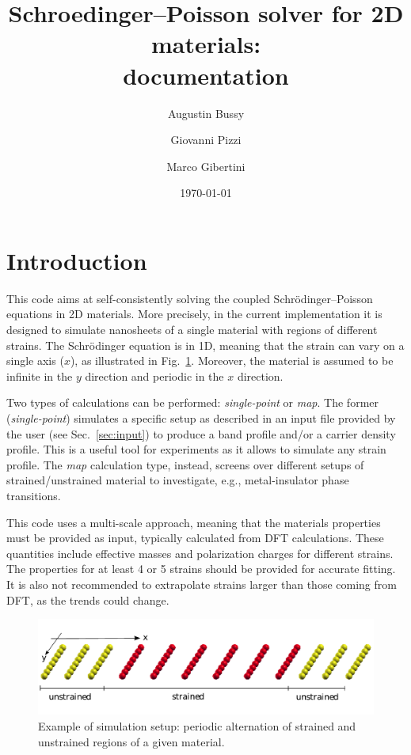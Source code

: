 \documentclass[a4paper,12pt]{article}
\begin{document}
\title{Schroedinger--Poisson solver for 2D materials:\\documentation}
\date{\today}
\author{Augustin Bussy \and Giovanni Pizzi \and Marco Gibertini} 
\maketitle

\section{Introduction}

This code aims at self-consistently solving the coupled Schr\"odinger--Poisson equations in 2D materials. More precisely, in the current implementation it is designed to simulate nanosheets of a single material with regions of different strains. The Schr\"odinger equation is in 1D, meaning that the strain can vary on a single axis ($x$), as illustrated in Fig.~\ref{fig:example1}. Moreover, the material is assumed to be infinite in the $y$ direction and periodic in the $x$ direction.

Two types of calculations can be performed: \emph{single-point} or \emph{map}. The former (\emph{single-point}) simulates a specific setup as described in an input file provided by the user (see Sec.~\ref{sec:input}) to produce a band profile and/or a carrier density profile. This is a useful tool for experiments as it allows to simulate any strain profile. The \emph{map} calculation type, instead, screens over different setups of strained/unstrained material to investigate, e.g., metal-insulator phase transitions.

This code uses a multi-scale approach, meaning that the materials properties must be provided as input, typically calculated from DFT calculations. These quantities include effective masses and polarization charges for different strains. The properties for at least 4 or 5 strains should be provided for accurate fitting. It is also not recommended to extrapolate strains larger than those coming from DFT, as the trends could change.

\begin{figure} [h]
\begin{center}
\captionsetup{width=0.95\textwidth}
\centerline{\includegraphics[width=12cm,angle=0]{img/example1}}
\caption{\small Example of simulation setup: periodic alternation of strained and unstrained regions of a given material.}
\label{fig:example1} 
\end{center}
\end{figure}
\end{document}
